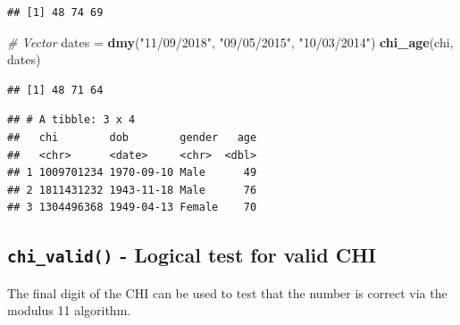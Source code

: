\documentclass[]{book}
\newenvironment{Shaded}{\begin{snugshade}}{\end{snugshade}}
\newcommand{\CommentTok}[1]{\textcolor[rgb]{0.56,0.35,0.01}{\textit{#1}}}
\newcommand{\DataTypeTok}[1]{\textcolor[rgb]{0.13,0.29,0.53}{#1}}
\newcommand{\KeywordTok}[1]{\textcolor[rgb]{0.13,0.29,0.53}{\textbf{#1}}}
\newcommand{\NormalTok}[1]{#1}
\newcommand{\OperatorTok}[1]{\textcolor[rgb]{0.81,0.36,0.00}{\textbf{#1}}}
\newcommand{\StringTok}[1]{\textcolor[rgb]{0.31,0.60,0.02}{#1}}
\begin{document}
\begin{verbatim}
## [1] 48 74 69
\end{verbatim}

\begin{Shaded}
\begin{Highlighting}[]
\CommentTok{# Vector}
\NormalTok{dates =}\StringTok{ }\KeywordTok{dmy}\NormalTok{(}\StringTok{"11/09/2018"}\NormalTok{,}
            \StringTok{"09/05/2015"}\NormalTok{,}
            \StringTok{"10/03/2014"}\NormalTok{)}
\KeywordTok{chi_age}\NormalTok{(chi, dates)}
\end{Highlighting}
\end{Shaded}

\begin{verbatim}
## [1] 48 71 64
\end{verbatim}

\begin{Shaded}
\end{Shaded}

\begin{verbatim}
## # A tibble: 3 x 4
##   chi        dob        gender   age
##   <chr>      <date>     <chr>  <dbl>
## 1 1009701234 1970-09-10 Male      49
## 2 1811431232 1943-11-18 Male      76
## 3 1304496368 1949-04-13 Female    70
\end{verbatim}

\hypertarget{chi_valid---logical-test-for-valid-chi}{%
\subsection{\texorpdfstring{\texttt{chi\_valid()} - Logical test for valid CHI}{chi\_valid() - Logical test for valid CHI}}\label{chi_valid---logical-test-for-valid-chi}}

The final digit of the CHI can be used to test that the number is correct via the modulus 11 algorithm.
\end{document}
